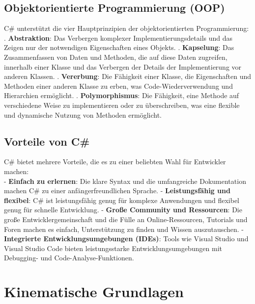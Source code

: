 \subsection{Objektorientierte Programmierung (OOP)}

C\# unterstützt die vier Hauptprinzipien der objektorientierten Programmierung:
\\

. \textbf{Abstraktion}: Das Verbergen komplexer Implementierungsdetails und das Zeigen nur der notwendigen Eigenschaften eines Objekts.
. \textbf{Kapselung}: Das Zusammenfassen von Daten und Methoden, die auf diese Daten zugreifen, innerhalb einer Klasse und das Verbergen der Details der Implementierung vor anderen Klassen.
. \textbf{Vererbung}: Die Fähigkeit einer Klasse, die Eigenschaften und Methoden einer anderen Klasse zu erben, was Code-Wiederverwendung und Hierarchien ermöglicht.
. \textbf{Polymorphismus}: Die Fähigkeit, eine Methode auf verschiedene Weise zu implementieren oder zu überschreiben, was eine flexible und dynamische Nutzung von Methoden ermöglicht.
\subsection{Vorteile von C\#}

C\# bietet mehrere Vorteile, die es zu einer beliebten Wahl für Entwickler machen:
\\

\noindent
- \textbf{Einfach zu erlernen}: Die klare Syntax und die umfangreiche Dokumentation machen C\# zu einer anfängerfreundlichen Sprache.
\newline
- \textbf{Leistungsfähig und flexibel}: C\# ist leistungsfähig genug für komplexe Anwendungen und flexibel genug für schnelle Entwicklung.
\newline
- \textbf{Große Community und Ressourcen}: Die große Entwicklergemeinschaft und die Fülle an Online-Ressourcen, Tutorials und Foren machen es einfach, Unterstützung zu finden und Wissen auszutauschen.
\newline
- \textbf{Integrierte Entwicklungsumgebungen (IDEs)}: Tools wie Visual Studio und Visual Studio Code bieten leistungsstarke Entwicklungsumgebungen mit Debugging- und Code-Analyse-Funktionen.

\section{Kinematische Grundlagen}\label{sec:KinematischeGrundlagen}

